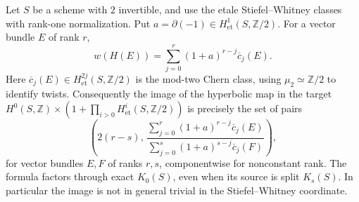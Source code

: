 \begin{proposition}
\label{C:hyperbolic_SW}
Let $S$ be a scheme with $2$ invertible, and use the etale Stiefel--Whitney
classes with rank-one normalization. Put $a=\partial(-1)\in
H^1_{\mathrm{et}}(S,\mathbb Z/2)$. For a vector bundle $E$ of rank $r$,
\[
 w(H(E))=\sum_{j=0}^r(1+a)^{r-j}\overline c_j(E).
                                                               \tag{C.3.5}
\]
Here $\overline c_j(E)\in H^{2j}_{\mathrm{et}}(S,\mathbb Z/2)$ is the
mod-two Chern class, using $\mu_2\simeq\mathbb Z/2$ to identify twists.
Consequently the image of the hyperbolic map in the target
$H^0(S,\mathbb Z)\times(1+\prod_{i>0}H^i_{\mathrm{et}}(S,\mathbb Z/2))$
is precisely the set of pairs
\[
 \left(2(r-s),\,
 \frac{\sum_{j=0}^r(1+a)^{r-j}\overline c_j(E)}
      {\sum_{j=0}^s(1+a)^{s-j}\overline c_j(F)}\right),          \tag{C.3.6}
\]
for vector bundles $E,F$ of ranks $r,s$, componentwise for nonconstant rank.
The formula factors through exact $K_0(S)$, even when its source is split
$K_s(S)$. In particular the image is not in general trivial in the
Stiefel--Whitney coordinate.
\end{proposition}
